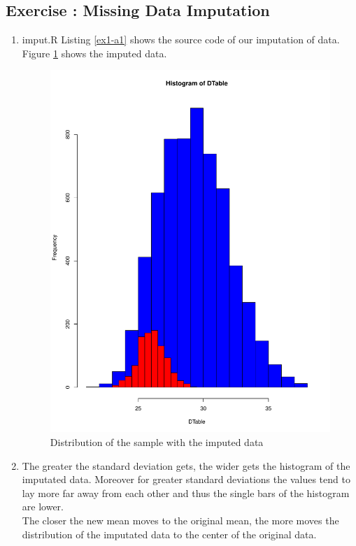 \documentclass[10pt,a4paper]{article}
\newcommand{\exercise}[1]
{
  \stepcounter{subsection}
  \subsection*{Exercise \thesubsection: #1}

}
\begin{document}
\exercise{Missing Data Imputation}
\begin{enumerate}
\item  {imput.R}
Listing \ref{ex1-a1} shows the source code of our imputation of data. Figure \ref{fig-1} shows the imputed data.\\
\begin{figure}
\includegraphics[scale=0.3]{Hist0.pdf}
\caption{Distribution of the sample with the imputed data}
\label{fig-1}
\end{figure}
\item The greater the standard deviation gets, the wider gets the histogram of the imputated data. Moreover for greater standard deviations the values tend to lay more far away from each other and thus the single bars of the histogram are lower.\\
The closer the new mean moves to the original mean, the more moves the distribution of the imputated data to the center of the original data.\\

\end{enumerate}
\end{document}
